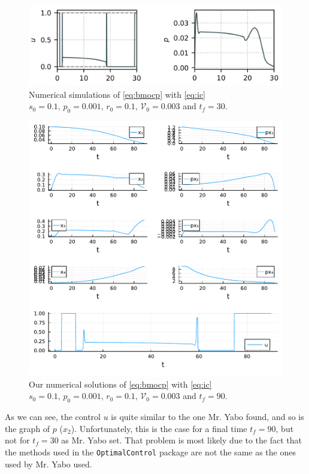 \documentclass{tudelft-report}
\begin{document}
\begin{figure}[H]
    \centering
    \includegraphics[width=\textwidth]{figures/control.png}
    \caption*{Numerical simulations of \eqref{eq:bmocp} with \eqref{eq:ic} $s_0 = 0.1,\, p_0 = 0.001,\, r_0=0.1,\, \mathcal{V}_0 = 0.003 $ and $t_f=30$.}
    \label{fig:control1}
\end{figure}
\begin{figure}[H]
\centering
\includegraphics[width=\textwidth]{figures/tf_90.pdf}
\caption*{Our numerical solutions of \eqref{eq:bmocp} with \eqref{eq:ic} $s_0 = 0.1,\, p_0 = 0.001,\, r_0=0.1,\, \mathcal{V}_0 = 0.003 $ and $t_f=90$.}
\end{figure}
As we can see, the control $u$ is quite similar to the one Mr. Yabo found, and so is the graph of $p$ ($x_2$). Unfortunately, this is the case for a final time $t_f=90$, but not for $t_f=30$ as Mr. Yabo set. That problem is most likely due to the fact that the methods used in the \verb|OptimalControl| package are not the same as the ones used by Mr. Yabo used.
\end{document}
